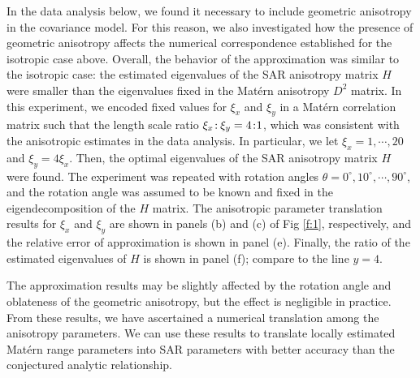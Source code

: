 \documentclass[review]{elsarticle}
\begin{document}

In the data analysis below, we found it necessary to include geometric anisotropy in the covariance model. For this reason, we also investigated how the presence of geometric anisotropy affects the numerical correspondence established for the isotropic case above. Overall, the behavior of the approximation was similar to the isotropic case: the estimated eigenvalues of the SAR anisotropy matrix $H$ were smaller than the eigenvalues fixed in the Mat\'ern anisotropy $D^2$ matrix. In this experiment, we encoded fixed values for $\xi_x$ and $\xi_y$ in a Mat\'ern correlation matrix such that the length scale ratio $\xi_x \colon \hspace{-0.4mm}  \xi_y = 4 \colon \hspace{-1mm} 1$, which was consistent with the anisotropic estimates in the data analysis. In particular, we let $\xi_x = 1, \cdots, 20$ and $\xi_y = 4\xi_x$. Then, the optimal eigenvalues of the SAR anisotropy matrix $H$ were found. The experiment was repeated with rotation angles $\theta = 0^{\circ}, 10^{\circ}, \cdots, 90^{\circ}$, and the rotation angle was assumed to be known and fixed in the eigendecomposition of the $H$ matrix. The anisotropic parameter translation results for $\xi_x$ and $\xi_y$ are shown in panels (b) and (c) of Fig \ref{f:1}, respectively, and the relative error of approximation is shown in panel (e). Finally, the ratio of the estimated eigenvalues of $H$ is shown in panel (f); compare to the line $y=4$.

The approximation results may be slightly affected by the rotation angle and oblateness of the geometric anisotropy, but the effect is negligible in practice. From these results, we have ascertained a numerical translation among the anisotropy parameters. We can use these results to translate locally estimated Mat\'ern range parameters into SAR parameters with better accuracy than the conjectured analytic relationship.
\end{document}
